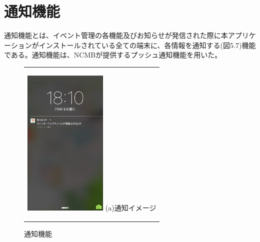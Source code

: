\section{通知機能}%
通知機能とは、イベント管理の各機能及びお知らせが発信された際に本アプリケーションがインストールされている全ての端末に、各情報を通知する(図5.7)機能である。通知機能は、NCMBが提供するプッシュ通知機能を用いた。

\begin{figure}[htbp]
  \begin{center}
    \begin{tabular}{c}

      \begin{minipage}{0.33\hsize}
        \begin{center}
\includegraphics[width=4cm]{notification.png}
          \hspace{1cm} %
          {\footnotesize (a)通知イメージ}
        \end{center}
      \end{minipage}

    \end{tabular}
    \caption{通知機能}
    \label{fig:lena}
  \end{center}
\end{figure}


